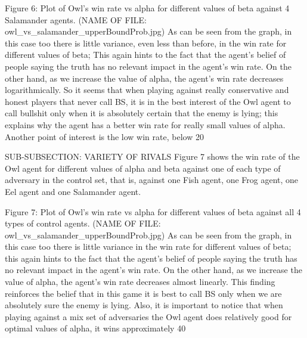 \documentclass[a4paper,12pt]{article}
\begin{document}
Figure 6: Plot of Owl’s win rate vs alpha for different values of beta against 4 Salamander agents. (NAME OF FILE: owl_vs_salamander_upperBoundProb.jpg)
As can be seen from the graph, in this case too there is little variance, even less than before, in the win rate for different values of beta;  This again hints to the fact that the agent’s belief of people saying the truth has no relevant impact in the agent’s win rate. On the other hand, as we increase the value of alpha, the agent’s win rate decreases logarithmically. So it seems that when playing against really conservative and honest players that never call BS, it is in the best interest of the Owl agent to call bullshit only when it is absolutely certain that the enemy is lying; this explains why the agent has a better win rate for really small values of alpha. Another point of interest is the low win rate, below 20%

SUB-SUBSECTION: VARIETY OF RIVALS
Figure 7 shows the win rate of the Owl agent for different values of alpha and beta against one of each type of adversary in the control set, that is, against one Fish agent, one Frog agent, one Eel agent and one Salamander agent. 

Figure 7: Plot of Owl’s win rate vs alpha for different values of beta against all 4 types of control agents. (NAME OF FILE: owl_vs_salamander_upperBoundProb.jpg)
As can be seen from the graph, in this case too there is little variance in the win rate for different values of beta;  this again hints to the fact that the agent’s belief of people saying the truth has no relevant impact in the agent’s win rate. On the other hand, as we increase the value of alpha, the agent’s win rate decreases almost linearly. This finding reinforces the belief that in this game it is best to call BS only when we are absolutely sure the enemy is lying. Also, it is important to notice that when playing against a mix set of adversaries the Owl agent does relatively good for optimal values of alpha, it wins approximately 40%
\end{document}
